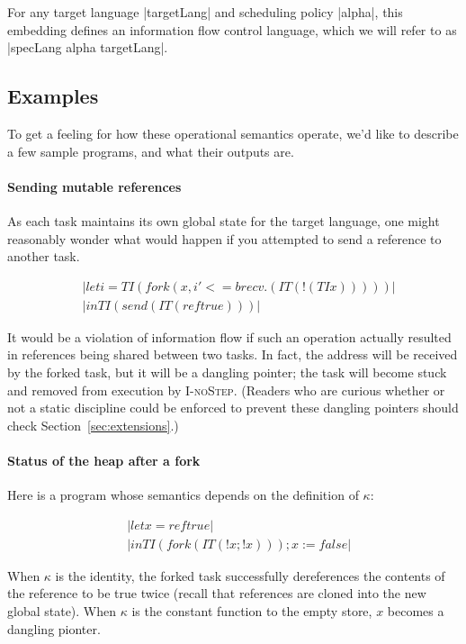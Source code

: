 For any target language |targetLang| and scheduling policy |alpha|, this
embedding defines an information flow control language, which we will
refer to as |specLang alpha targetLang|.

\subsection{Examples}

To get a feeling for how these operational semantics operate, we'd like to
describe a few sample programs, and what their outputs are.

\paragraph{Sending mutable references}  As each task maintains its own
global state for the target language, one might reasonably wonder what would
happen if you attempted to send a reference to another task.

\begin{align*}
    & |let i = TI (fork (x, i' <= brecv . (IT (!(TI x)))))| \\
    & |in TI (send (IT (ref true)))|
\end{align*}

It would be a violation of information flow if such an operation actually
resulted in references being shared between two tasks.  In fact, the address
will be received by the forked task, but it will be a dangling pointer; the
task will become stuck and removed from execution by \textsc{I-noStep}.  (Readers
who are curious whether or not a static discipline could be enforced to
prevent these dangling pointers should check Section~\ref{sec:extensions}.)

\paragraph{Status of the heap after a fork}  Here is a program whose
semantics depends on the definition of $\kappa$:

\begin{align*}
    & |let x = ref true| \\
    & |in TI (fork (IT (!x; !x))); x := false|
\end{align*}

When $\kappa$ is the identity, the forked task successfully dereferences
the contents of the reference to be true twice (recall that references
are cloned into the new global state).  When $\kappa$ is the constant function
to the empty store, $x$ becomes a dangling pionter.

